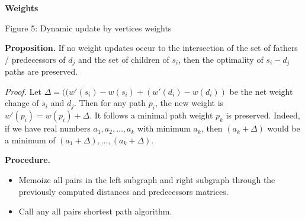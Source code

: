 \textbf{Weights}

\begin{center}
    
    Figure 5: Dynamic update by vertices weights
\end{center}

\textbf{Proposition.} If no weight updates occur to the intersection of the set of fathers / predecessors of $d_j$ and the set of children of $s_i$, then the optimality of $s_i-d_j$ paths are preserved.

\textit{Proof.} Let $\Delta = ((w'(s_i) - w(s_i) + (w'(d_i) - w(d_i))$ be the net weight change of $s_i$ and $d_j$. Then for any path $p_i$, the new weight is $w'(p_i) = w(p_i) + \Delta$. It follows a minimal path weight $p_k$ is preserved. Indeed, if we have real numbers $a_1, a_2, \dots, a_k$ with minimum $a_k$, then $(a_k + \Delta)$ would be a minimum of $(a_1 + \Delta), \dots, (a_k + \Delta)$.

\textbf{Procedure.}
\begin{itemize}
    \item Memoize all pairs in the left subgraph and right subgraph through the previously computed distances and predecessors matrices.
    \item Call any all pairs shortest path algorithm.
\end{itemize}

